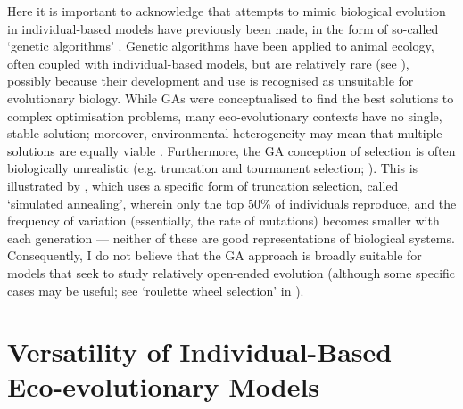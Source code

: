 Here it is important to acknowledge that attempts to mimic biological evolution in individual-based models have previously been made, in the form of so-called `genetic algorithms' \parencite[GAs:][]{hamblin2013}.
Genetic algorithms have been applied to animal ecology, often coupled with individual-based models, but are relatively rare (see \cite{hamblin2013,beauchamp2007,hamblin2010,getz2015,getz2016}), possibly because their development and use is recognised as unsuitable for evolutionary biology.
While GAs were conceptualised to find the best solutions to complex optimisation problems, many eco-evolutionary contexts have no single, stable solution; moreover, environmental heterogeneity may mean that multiple solutions are equally viable \parencite{wolf2012}.
Furthermore, the GA conception of selection is often biologically unrealistic (e.g. truncation and tournament selection; \cite{hamblin2013}).
This is illustrated by \textcite{getz2015}, which uses a specific form of truncation selection, called `simulated annealing', wherein only the top 50\% of individuals reproduce, and the frequency of variation (essentially, the rate of mutations) becomes smaller with each generation --- neither of these are good representations of biological systems.
Consequently, I do not believe that the GA approach is broadly suitable for models that seek to study relatively open-ended evolution (although some specific cases may be useful; see `roulette wheel selection' in \cite{hamblin2013}).


\section*{Versatility of Individual-Based Eco-evolutionary Models}

